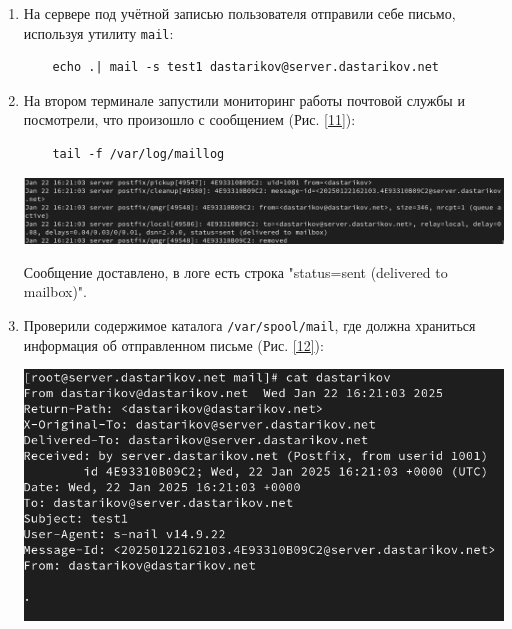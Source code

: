 \begin{enumerate}

\item На сервере под учётной записью пользователя отправили себе письмо, используя утилиту \texttt{mail}:
  \begin{verbatim}
    echo .| mail -s test1 dastarikov@server.dastarikov.net
  \end{verbatim}
\item На втором терминале запустили мониторинг работы почтовой службы и посмотрели, что произошло с сообщением (Рис. \ref{11}):
  \begin{verbatim}
    tail -f /var/log/maillog
  \end{verbatim}

\begin{center}
    \centering
    \includegraphics[width=\textwidth]{../images/image11.png}
    \label{11}
\end{center}

Сообщение доставлено, в логе есть строка "status=sent (delivered to mailbox)".

\item Проверили содержимое каталога \texttt{/var/spool/mail}, где должна храниться информация об отправленном письме (Рис. \ref{12}):
\begin{center}
    \centering
    \includegraphics[width=\textwidth]{../images/image12.png}
    \label{12}
\end{center}



\end{enumerate}
